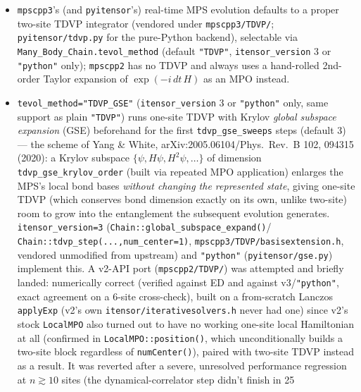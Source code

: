\documentclass[11pt]{article}
\begin{document}
\begin{itemize}
    exists because \texttt{self.wf0} is a \emph{separate} C++ MPS from
    the session's own
    (\texttt{groundstate.gs\_energy\_single} copies
    \texttt{gs\_wavefunction()} out), as is any MPS the caller kept a
    reference to.
  \item \texttt{mpscpp3}'s (and \texttt{pyitensor}'s) real-time MPS
    evolution defaults to a proper two-site TDVP integrator (vendored
    under \texttt{mpscpp3/TDVP/}; \texttt{pyitensor/tdvp.py} for the
    pure-Python backend), selectable via
    \texttt{Many\_Body\_Chain.tevol\_method} (default \texttt{"TDVP"},
    \texttt{itensor\_version} 3 or \texttt{"python"} only);
    \texttt{mpscpp2} has no TDVP and always uses a hand-rolled 2nd-order
    Taylor expansion of $\exp(-i\,dt\,H)$ as an MPO instead.
  \item \texttt{tevol\_method="TDVP\_GSE"} (\texttt{itensor\_version} 3 or
    \texttt{"python"} only, same support as plain \texttt{"TDVP"}) runs
    one-site TDVP with Krylov \emph{global subspace expansion} (GSE)
    beforehand for the first \texttt{tdvp\_gse\_sweeps} steps (default 3)
    --- the scheme of Yang \& White, arXiv:2005.06104/Phys.\ Rev.\ B 102,
    094315 (2020): a Krylov subspace $\{\psi,H\psi,H^2\psi,\dots\}$ of
    dimension \texttt{tdvp\_gse\_krylov\_order} (built via repeated MPO
    application) enlarges the MPS's local bond bases \emph{without
    changing the represented state}, giving one-site TDVP (which
    conserves bond dimension exactly on its own, unlike two-site) room to
    grow into the entanglement the subsequent evolution generates.
    \texttt{itensor\_version=3}
    (\texttt{Chain::global\_subspace\_expand()}/
    \texttt{Chain::tdvp\_step(...,num\_center=1)},
    \texttt{mpscpp3/TDVP/basisextension.h}, vendored unmodified from
    upstream) and \texttt{"python"} (\texttt{pyitensor/gse.py}) implement
    this. A v2-API port (\texttt{mpscpp2/TDVP/}) was attempted and
    briefly landed: numerically correct (verified against ED and against
    v3/\texttt{"python"}, exact agreement on a 6-site cross-check), built
    on a from-scratch Lanczos \texttt{applyExp} (v2's own
    \texttt{itensor/iterativesolvers.h} never had one) since v2's stock
    \texttt{LocalMPO} also turned out to have no working one-site local
    Hamiltonian at all (confirmed in \texttt{LocalMPO::position()}, which
    unconditionally builds a two-site block regardless of
    \texttt{numCenter()}), paired with two-site TDVP instead as a result.
    It was reverted after a severe, unresolved performance regression at
    $n\gtrsim10$ sites (the dynamical-correlator step didn't finish in 25

\end{itemize}
\end{document}
